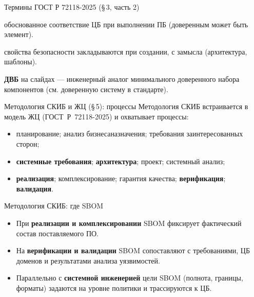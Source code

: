 \documentclass[aspectratio=169,10pt]{beamer}
\begin{document}
\begin{frame}{Термины ГОСТ Р 72118-2025 (§\,3, часть 2)}
\scriptsize
\begin{description}
  \setlength{\itemsep}{0.1em}
  \item[Доверенная система] обоснованное соответствие ЦБ при выполнении ПБ (доверенным может быть элемент).
  \item[Конструктивный подход] свойства безопасности закладываются при создании, с замысла (архитектура, шаблоны).
\end{description}
\vspace{0.35em}
\footnotesize \textbf{ДВБ} на слайдах — инженерный аналог минимального доверенного набора компонентов (см. доверенную систему в стандарте).
\end{frame}

\begin{frame}{Методология СКИБ и ЖЦ (§\,5): процессы}
\footnotesize
Методология СКИБ встраивается в модель ЖЦ (ГОСТ~Р~72118-2025) и охватывает процессы:
\begin{itemize}
  \setlength{\itemsep}{0.08em}
  \item планирование; анализ бизнеса\/назначения; требования заинтересованных сторон;
  \item \textbf{системные требования}; \textbf{архитектура}; проект; системный анализ;
  \item \textbf{реализация}; комплексирование; гарантия качества; \textbf{верификация}; \textbf{валидация}.
\end{itemize}
\end{frame}

\begin{frame}{Методология СКИБ: где SBOM}
\footnotesize
\begin{itemize}
  \setlength{\itemsep}{0.15em}
  \item При \textbf{реализации и комплексировании} SBOM фиксирует фактический состав поставляемого ПО.
  \item На \textbf{верификации и валидации} SBOM сопоставляют с требованиями, ЦБ доменов и результатами анализа уязвимостей.
  \item Параллельно с \textbf{системной инженерией} цели SBOM (полнота, границы, форматы) задаются на уровне политики и трассируются к ЦБ.
\end{itemize}
\end{frame}
\end{document}
